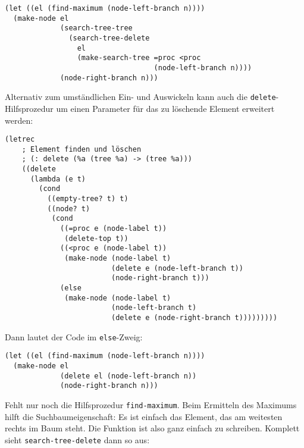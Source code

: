 \begin{verbatim}
(let ((el (find-maximum (node-left-branch n))))
  (make-node el
             (search-tree-tree
               (search-tree-delete
                 el
                 (make-search-tree =proc <proc
                                   (node-left-branch n))))
             (node-right-branch n)))
\end{verbatim}
%
Alternativ zum umständlichen Ein-
und Auswickeln kann auch die \texttt{delete}-Hilfsprozedur um einen
Parameter für das zu löschende Element erweitert werden:
%
\begin{verbatim}
(letrec
    ; Element finden und löschen
    ; (: delete (%a (tree %a) -> (tree %a)))
    ((delete
      (lambda (e t)
        (cond
          ((empty-tree? t) t)
          ((node? t)
           (cond
             ((=proc e (node-label t))
              (delete-top t))
             ((<proc e (node-label t))
              (make-node (node-label t)
                         (delete e (node-left-branch t))
                         (node-right-branch t)))
             (else
              (make-node (node-label t)
                         (node-left-branch t)
                         (delete e (node-right-branch t)))))))))
\end{verbatim}
%
Dann lautet der Code im \texttt{else}-Zweig:
%
\begin{verbatim}
(let ((el (find-maximum (node-left-branch n))))
  (make-node el
             (delete el (node-left-branch n))
             (node-right-branch n)))
\end{verbatim}
%
Fehlt nur noch die Hilfsprozedur \texttt{find-maximum}.  Beim
Ermitteln des Maximums hilft die Suchbaumeigenschaft: Es ist einfach
das Element, das am weitesten rechts im Baum steht.  Die Funktion ist
also ganz einfach zu schreiben.  Komplett sieht
\texttt{search-tree-delete} dann so aus:
%
